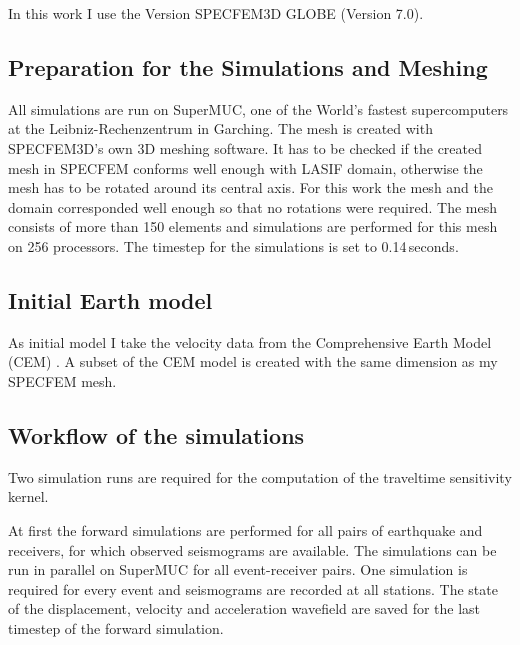 In this work I use the Version SPECFEM3D GLOBE (Version 7.0). 


\subsection{Preparation for the Simulations and Meshing}

All simulations are run on SuperMUC, one of the World's fastest supercomputers at the Leibniz-Rechenzentrum in Garching. 
The mesh is created with SPECFEM3D's own 3D meshing software. 
It has to be checked if the created mesh in SPECFEM conforms well enough with LASIF domain, otherwise the mesh has to 
be rotated around its central axis.
For this work the mesh and the domain corresponded well enough so that no rotations were required.
The mesh consists of more than 150 %
elements and simulations are performed for this mesh on 256 processors.
The timestep for the simulations is set to 0.14$\,$seconds.  


\subsection{Initial Earth model}

As initial model I take the velocity data from the Comprehensive Earth Model (CEM) \citep{Afanasiev2014}.
A subset of the CEM model is created with the same dimension as my SPECFEM mesh. 


\subsection{Workflow of the simulations}

Two simulation runs are required for the computation of the traveltime sensitivity kernel.

At first the forward simulations are performed for all pairs of earthquake and receivers, for which observed seismograms are available.
The simulations can be run in parallel on SuperMUC for all event-receiver pairs. 
One simulation is required for every event and seismograms are recorded at all stations. %
The state of the displacement, velocity and acceleration wavefield are saved for the last timestep of the forward simulation.

